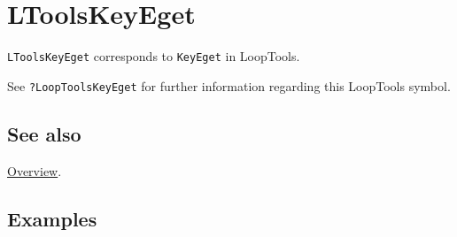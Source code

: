 \documentclass[../FeynHelpersManual.tex]{subfiles}
\begin{document}
\hypertarget{ltoolskeyeget}{
\section{LToolsKeyEget}\label{ltoolskeyeget}}

\texttt{LToolsKeyEget} corresponds to \texttt{KeyEget} in LoopTools.

See \texttt{?LoopTools\textasciigrave KeyEget} for further information
regarding this LoopTools symbol.

\subsection{See also}

\hyperlink{toc}{Overview}.

\subsection{Examples}
\end{document}
